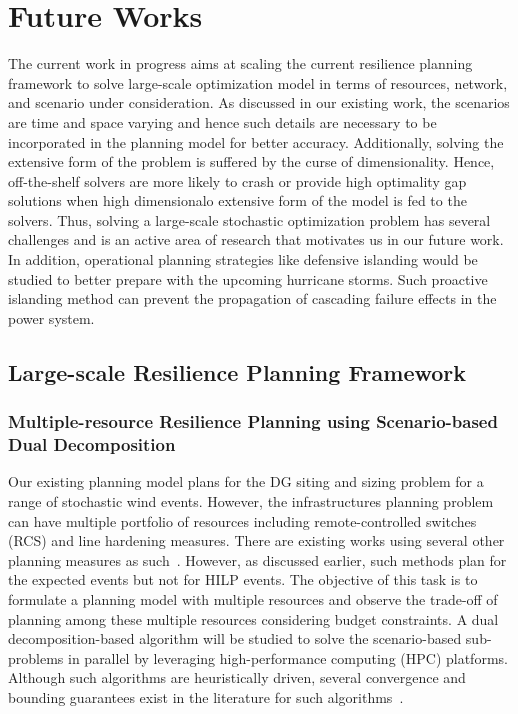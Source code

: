 \section{Future Works}\label{sec:future_Work}
The current work in progress aims at scaling the current resilience planning framework to solve large-scale optimization model in terms of resources, network, and scenario under consideration. As discussed in our existing work, the scenarios are time and space varying and hence such details are necessary to be incorporated in the planning model for better accuracy. Additionally, solving the extensive form of the problem is suffered by the curse of dimensionality. Hence, off-the-shelf solvers are more likely to crash or provide high optimality gap solutions when high dimensionalo extensive form of the model is fed to the solvers. Thus, solving a large-scale stochastic optimization problem has several challenges and is an active area of research that motivates us in our future work. In addition, operational planning strategies like defensive islanding would be studied to better prepare with the upcoming hurricane storms. Such proactive islanding method can prevent the propagation of cascading failure effects in the power system.

\subsection{Large-scale Resilience Planning Framework}
\subsubsection{Multiple-resource Resilience Planning using Scenario-based Dual Decomposition}
Our existing planning model plans for the DG siting and sizing problem for a range of stochastic wind events. However, the infrastructures planning problem can have multiple portfolio of resources including remote-controlled switches (RCS) and line hardening measures. There are existing works using several other planning measures as such~\cite{7514755}. However, as discussed earlier, such methods plan for the expected events but not for HILP events. The objective of this task is to formulate a planning model with multiple resources and observe the trade-off of planning among these multiple resources considering budget constraints. A dual decomposition-based algorithm will be studied to solve the scenario-based sub-problems in parallel by leveraging high-performance computing (HPC) platforms. Although such algorithms are heuristically driven, several convergence  and bounding guarantees exist in the literature for such algorithms~\cite{boland2018combining}.   

